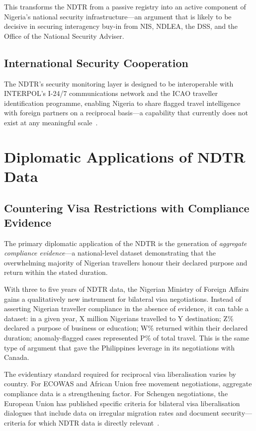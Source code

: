 \documentclass[11pt]{article}
\begin{document}
This transforms the NDTR from a passive registry into an active
component of Nigeria's national security infrastructure---an
argument that is likely to be decisive in securing interagency
buy-in from NIS, NDLEA, the DSS, and the Office of the
National Security Adviser.

\subsection{International Security Cooperation}

The NDTR's security monitoring layer is designed to be interoperable
with INTERPOL's I-24/7 communications network and the ICAO
traveller identification programme, enabling Nigeria to share
flagged travel intelligence with foreign partners on a
reciprocal basis---a capability that currently does not exist
at any meaningful scale~\cite{icao2023}.

\section{Diplomatic Applications of NDTR Data}
\label{sec:diplomatic}

\subsection{Countering Visa Restrictions with Compliance Evidence}

The primary diplomatic application of the NDTR is the generation
of \textit{aggregate compliance evidence}---a national-level
dataset demonstrating that the overwhelming majority of Nigerian
travellers honour their declared purpose and return within the
stated duration.

With three to five years of NDTR data, the Nigerian Ministry of
Foreign Affairs gains a qualitatively new instrument for bilateral
visa negotiations. Instead of asserting Nigerian traveller compliance
in the absence of evidence, it can table a dataset: in a given year,
X million Nigerians travelled to Y destination; Z\% declared a
purpose of business or education; W\% returned within their declared
duration; anomaly-flagged cases represented P\% of total travel.
This is the same type of argument that gave the Philippines leverage
in its negotiations with Canada.

The evidentiary standard required for reciprocal visa liberalisation
varies by country. For ECOWAS and African Union free movement negotiations,
aggregate compliance data is a strengthening factor.
For Schengen negotiations, the European Union has published specific
criteria for bilateral visa liberalisation dialogues that include
data on irregular migration rates and document security---criteria
for which NDTR data is directly relevant~\cite{euvisadialogue2023}.
\end{document}
